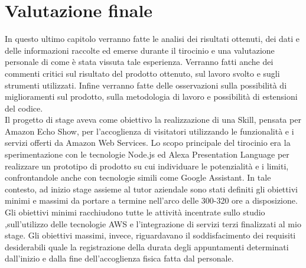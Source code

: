 
\chapter{Valutazione finale}
\label{cap:valutazione_finale}
In questo ultimo capitolo verranno fatte le analisi dei risultati ottenuti, dei dati e delle informazioni raccolte ed emerse durante il tirocinio e una valutazione personale di come è stata vissuta tale esperienza. Verranno fatti anche dei commenti critici sul risultato del prodotto ottenuto, sul lavoro svolto e sugli strumenti utilizzati. Infine verranno fatte delle osservazioni sulla possibilità di miglioramenti sul prodotto, sulla metodologia di lavoro e possibilità di estensioni del codice.
\\[0.6cm]
Il progetto di stage aveva come obiettivo la realizzazione di una Skill, pensata per Amazon Echo Show, per l'accoglienza di visitatori utilizzando le funzionalità e i servizi offerti da Amazon Web Services.
Lo scopo principale del tirocinio era la sperimentazione con le tecnologie Node.js ed Alexa Presentation Language per realizzare un prototipo di prodotto su cui individuare le potenzialità e i limiti, confrontandole anche con tecnologie simili come Google Assistant. In tale contesto, ad inizio stage assieme al tutor aziendale sono stati definiti gli obiettivi minimi e massimi da portare a termine nell'arco delle 300-320 ore a disposizione. Gli obiettivi minimi racchiudono tutte le attività incentrate sullo studio ,sull'utilizzo delle tecnologie AWS e l'integrazione di servizi terzi finalizzati al mio stage. Gli obiettivi massimi, invece, riguardavano il soddisfacimento dei requisiti desiderabili quale la registrazione della durata degli appuntamenti determinati dall'inizio e dalla fine dell'accoglienza fisica fatta dal personale.
